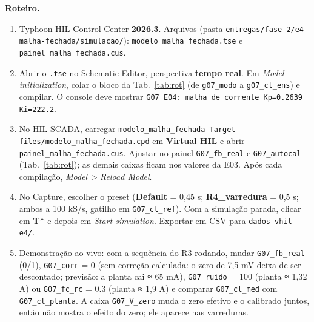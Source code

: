 \documentclass[10pt,a4paper]{article}
\begin{document}
\textbf{Roteiro.}
\begin{enumerate}
\item Typhoon HIL Control Center \textbf{2026.3}. Arquivos (pasta \texttt{entregas/fase-2/e4-malha-fechada/simulacao/}): \texttt{modelo\_malha\_fechada.tse} e \texttt{painel\_malha\_fechada.cus}.
\item Abrir o \texttt{.tse} no Schematic Editor, perspectiva \textbf{tempo real}. Em \emph{Model initialization}, colar o bloco da Tab.~\ref{tab:rot} (de \texttt{g07\_modo} a \texttt{g07\_cl\_ens}) e compilar. O console deve mostrar \texttt{G07 E04: malha de corrente Kp=0.2639 Ki=222.2}.
\item No HIL SCADA, carregar \texttt{modelo\_malha\_fechada Target files/modelo\_malha\_fechada.cpd} em \textbf{Virtual HIL} e abrir \texttt{painel\_malha\_fechada.cus}. Ajustar no painel \texttt{G07\_fb\_real} e \texttt{G07\_autocal} (Tab.~\ref{tab:rot}); as demais caixas ficam nos valores da E03. Após cada compilação, \emph{Model > Reload Model}.
\item No Capture, escolher o preset (\textbf{Default} = 0,45 s; \textbf{R4\_varredura} = 0,5 s; ambos a 100 kS/s, gatilho em \texttt{G07\_cl\_ref}). Com a simulação parada, clicar em \textbf{T↑} e depois em \emph{Start simulation}. Exportar em CSV para \texttt{dados-vhil-e4/}.
\item Demonstração ao vivo: com a sequência do R3 rodando, mudar \texttt{G07\_fb\_real} (0/1), \texttt{G07\_corr} = 0 (sem correção calculada: o zero de 7,5 mV deixa de ser descontado; previsão: a planta cai ≈ 65 mA), \texttt{G07\_ruido} = 100 (planta ≈ 1,32 A) ou \texttt{G07\_fc\_rc} = 0.3 (planta ≈ 1,9 A) e comparar \texttt{G07\_cl\_med} com \texttt{G07\_cl\_planta}. A caixa \texttt{G07\_V\_zero} muda o zero efetivo e o calibrado juntos, então não mostra o efeito do zero; ele aparece nas varreduras.
\end{enumerate}
\end{document}
